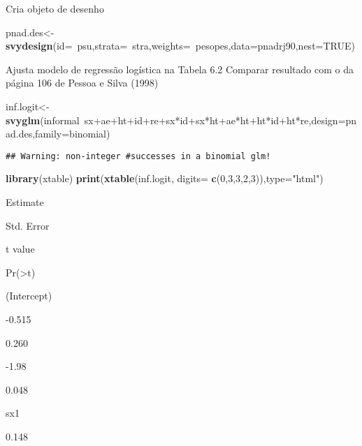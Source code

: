 \documentclass[]{book}
\newenvironment{Shaded}{\begin{snugshade}}{\end{snugshade}}
\newcommand{\KeywordTok}[1]{\textcolor[rgb]{0.13,0.29,0.53}{\textbf{{#1}}}}
\newcommand{\DataTypeTok}[1]{\textcolor[rgb]{0.13,0.29,0.53}{{#1}}}
\newcommand{\DecValTok}[1]{\textcolor[rgb]{0.00,0.00,0.81}{{#1}}}
\newcommand{\StringTok}[1]{\textcolor[rgb]{0.31,0.60,0.02}{{#1}}}
\newcommand{\OtherTok}[1]{\textcolor[rgb]{0.56,0.35,0.01}{{#1}}}
\newcommand{\NormalTok}[1]{{#1}}
\begin{document}
Cria objeto de desenho

\begin{Shaded}
\begin{Highlighting}[]
\NormalTok{pnad.des<-}\KeywordTok{svydesign}\NormalTok{(}\DataTypeTok{id=}\NormalTok{~psu,}\DataTypeTok{strata=}\NormalTok{~stra,}\DataTypeTok{weights=}\NormalTok{~pesopes,}\DataTypeTok{data=}\NormalTok{pnadrj90,}\DataTypeTok{nest=}\OtherTok{TRUE}\NormalTok{)}
\end{Highlighting}
\end{Shaded}

Ajusta modelo de regressão logística na Tabela 6.2 Comparar resultado
com o da página 106 de Pessoa e Silva (1998)

\begin{Shaded}
\begin{Highlighting}[]
\NormalTok{inf.logit<-}\KeywordTok{svyglm}\NormalTok{(informal~sx+ae+ht+id+re+sx*id+sx*ht+ae*ht+ht*id+ht*re,}\DataTypeTok{design=}\NormalTok{pnad.des,}\DataTypeTok{family=}\NormalTok{binomial)}
\end{Highlighting}
\end{Shaded}

\begin{verbatim}
## Warning: non-integer #successes in a binomial glm!
\end{verbatim}

\begin{Shaded}
\begin{Highlighting}[]
\KeywordTok{library}\NormalTok{(xtable)}
\KeywordTok{print}\NormalTok{(}\KeywordTok{xtable}\NormalTok{(inf.logit, }\DataTypeTok{digits=} \KeywordTok{c}\NormalTok{(}\DecValTok{0}\NormalTok{,}\DecValTok{3}\NormalTok{,}\DecValTok{3}\NormalTok{,}\DecValTok{2}\NormalTok{,}\DecValTok{3}\NormalTok{)),}\DataTypeTok{type=}\StringTok{"html"}\NormalTok{)}
\end{Highlighting}
\end{Shaded}

Estimate

Std. Error

t value

Pr(\textgreater{}\textbar{}t\textbar{})

(Intercept)

-0.515

0.260

-1.98

0.048

sx1

0.148
\end{document}
